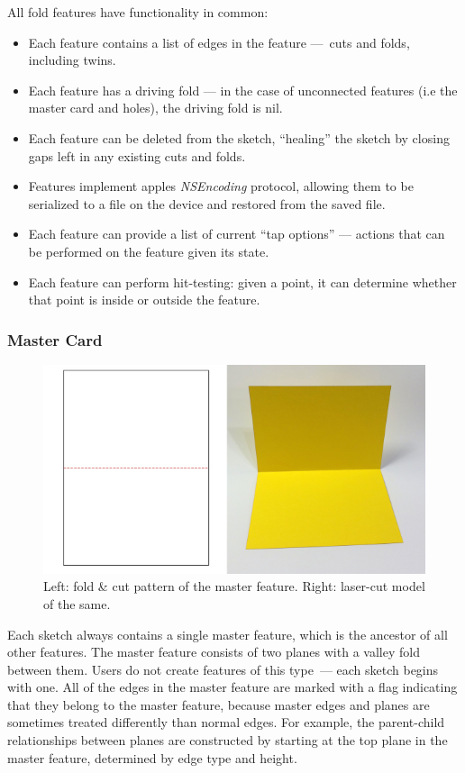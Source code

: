 All fold features have functionality in common:

\begin{itemize}
\itemsep1pt\parskip0pt
\item
  Each feature contains a list of edges in the feature ---~cuts and
  folds, including twins.
\item
  Each feature has a driving fold --- in the case of unconnected
  features (i.e the master card and holes), the driving fold is nil.
\item
  Each feature can be deleted from the sketch, ``healing'' the sketch by
  closing gaps left in any existing cuts and folds.
\item
  Features implement apples \emph{NSEncoding} protocol, allowing them to
  be serialized to a file on the device and restored from the saved
  file.
\item
  Each feature can provide a list of current ``tap options'' --- actions
  that can be performed on the feature given its state.
\item
  Each feature can perform hit-testing: given a point, it can determine
  whether that point is inside or outside the feature.
\end{itemize}

\subsubsection{Master Card}\label{master-card}

\begin{figure}[htbp]
\centering
\includegraphics{figures/33_UI_Interface_Data_Structures/mastercard.pdf}
\caption{Left: fold \& cut pattern of the master feature. Right:
laser-cut model of the same.}
\end{figure}

Each sketch always contains a single master feature, which is the
ancestor of all other features. The master feature consists of two
planes with a valley fold between them. Users do not create features of
this type~--- each sketch begins with one. All of the edges in the
master feature are marked with a flag indicating that they belong to the
master feature, because master edges and planes are sometimes treated
differently than normal edges. For example, the parent-child
relationships between planes are constructed by starting at the top
plane in the master feature, determined by edge type and height.

